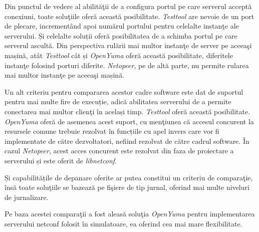 Din punctul de vedere al abilităţii de a configura portul pe care serverul acceptă conexiuni, toate soluţiile oferă această posibilitate. \textit{Testtool} are nevoie de un port de plecare, incrementând apoi numărul portului pentru celelalte instanţe ale serverului. Și celelalte soluții oferă posibilitatea de a schimba portul pe care serverul ascultă. Din perspectiva rulării mai multor instanţe de server pe aceeaşi mașină, atât \textit{Testtool} cât și \textit{OpenYuma} oferă această posibilitate, diferitele instanţe folosind porturi diferite. \textit{Netopeer}, pe de altă parte, nu permite rularea mai multor instanţe pe aceeaşi mașină.

Un alt criteriu pentru compararea acestor cadre software este dat de suportul pentru mai multe fire de execuție, adică abilitatea serverului de a permite conectarea mai multor clienţi în același timp. \textit{Testtool} oferă această posibilitate. \textit{OpenYuma} oferă de asemenea acest suport, cu menţiunea că accesul concurent la resursele comune trebuie rezolvat în funcțiile cu apel invers care vor fi implementate de către dezvoltatori, nefiind rezolvat de către cadrul software. În cazul \textit{Netopeer}, acest acces concurent este rezolvat din faza de proiectare a serverului și este oferit de \textit{libnetconf}.

Și capabilitățile de depanare oferite ar putea constitui un criteriu de comparaţie, însă toate soluţiile se bazează pe fişiere de tip jurnal, oferind mai multe niveluri de jurnalizare.

Pe baza acestei comparaţii a fost aleasă soluţia \textit{OpenYuma} pentru implementarea serverului \gls{netconf} folosit în simulatoare, ea oferind cea mai mare flexibilitate.